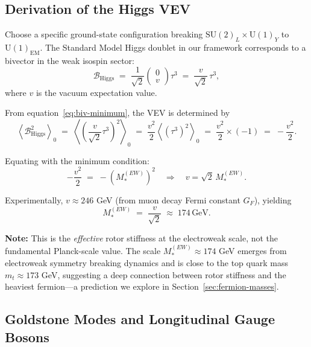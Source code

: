 \documentclass[11pt,a4paper]{article}
\newcommand{\grade}[2]{\left\langle #1 \right\rangle_{#2}}
\newcommand{\scal}[1]{\grade{#1}{0}}
\newcommand{\Biv}{\mathcal{B}}
\newcommand{\SU}{\mathrm{SU}}
\newcommand{\U}{\mathrm{U}}
\theoremstyle{definition}
\theoremstyle{plain}
\theoremstyle{remark}
\begin{document}
\subsection{Derivation of the Higgs VEV}

Choose a specific ground-state configuration breaking $\SU(2)_L \times \U(1)_Y$ to $\U(1)_{\text{EM}}$. The Standard Model Higgs doublet in our framework corresponds to a bivector in the weak isospin sector:
\begin{equation}
  \Biv_{\text{Higgs}} \;=\; \frac{1}{\sqrt{2}}\begin{pmatrix} 0 \\ v \end{pmatrix} \tau^3
  \;=\; \frac{v}{\sqrt{2}}\,\tau^3,
\end{equation}
where $v$ is the vacuum expectation value.

From equation~\eqref{eq:biv-minimum}, the VEV is determined by
\begin{equation}
  \scal{\Biv_{\text{Higgs}}^2} \;=\; \scal{\left(\frac{v}{\sqrt{2}}\tau^3\right)^2}
  \;=\; \frac{v^2}{2}\scal{(\tau^3)^2}
  \;=\; \frac{v^2}{2} \times (-1)
  \;=\; -\frac{v^2}{2}.
\end{equation}

Equating with the minimum condition:
\begin{equation}
  -\frac{v^2}{2} \;=\; -(M_*^{(EW)})^2 \quad\Rightarrow\quad v = \sqrt{2}\,M_*^{(EW)}.
\end{equation}

Experimentally, $v \approx 246$ GeV (from muon decay Fermi constant $G_F$), yielding
\begin{equation}
  \boxed{M_*^{(EW)} \;=\; \frac{v}{\sqrt{2}} \;\approx\; 174\,\text{GeV}.}
  \label{eq:rotor-stiffness}
\end{equation}

\textbf{Note:} This is the \emph{effective} rotor stiffness at the electroweak scale, not the fundamental Planck-scale value. The scale $M_*^{(EW)} \approx 174$ GeV emerges from electroweak symmetry breaking dynamics and is close to the top quark mass $m_t \approx 173$ GeV, suggesting a deep connection between rotor stiffness and the heaviest fermion---a prediction we explore in Section~\ref{sec:fermion-masses}.

\subsection{Goldstone Modes and Longitudinal Gauge Bosons}
\end{document}
